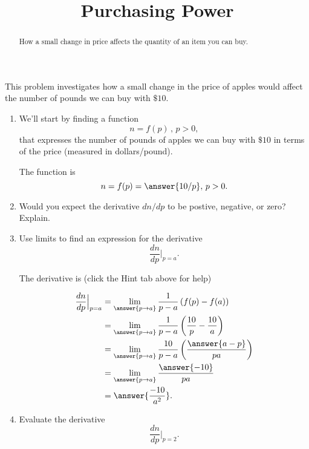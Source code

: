 \documentclass{ximera}
\title{Purchasing Power}
\begin{document}
\begin{abstract}
How a small change in price affects the quantity of an item you can buy.
\end{abstract}
\maketitle


\begin{question} \label{Qdgvvbrtghgygrert}
This problem investigates how a small change in the price of apples would affect the number of pounds we can buy with $\$10$.

\begin{enumerate}

\item We'll start by finding a function
\[
       n = f(p) \, , \, p>0 ,
\]
that expresses the number of pounds of apples we can buy with $\$10$ in terms of the price (measured in dollars/pound).

The function is
\[
       n = f(p) = \answer{10/p} ,\, p>0.
\]

\item Would you expect the derivative $dn/dp$ to be postive, negative, or zero? Explain.

\item Use limits to find an expression for the derivative
\[
    \frac{dn}{dp} \Big|_{p=a}.
\]

The derivative is (click the Hint tab above for help)

\begin{hint}
\begin{align*}
          \frac{dn}{dp} \Big|_{p=a} &= \lim_{\answer{p\to a}} \frac{1}{p-a} \left( f(p)-f(a) \right)  \\
                                                 &=  \lim_{\answer{p\to a}} \frac{1}{p-a} \left(\frac{10}{p} - \frac{10}{a} \right)  \\
                                                 &=  \lim_{\answer{p\to a}} \frac{10}{p-a} \left(\frac{\answer{a-p}}{pa} \right)  \\
                                                  &=  \lim_{\answer{p\to a}} \frac{\answer{-10}}{pa} \\
                                                  & = \answer{\frac{-10}{a^2}} .
\end{align*}
\end{hint}

\item Evaluate the derivative 
\[
         \frac{dn}{dp} \Big|_{p=2} . 
\]


\end{enumerate}
\end{question}
\end{document}
